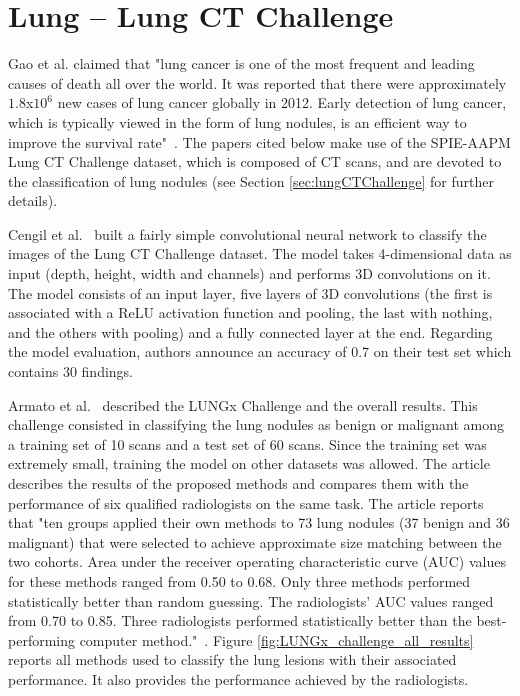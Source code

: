 \section{Lung -- Lung CT Challenge}
\setlength{\marginparwidth}{3cm}\leavevmode {}Gao et al. claimed that "lung cancer is one of the most frequent and leading causes of death all over the world. It was reported that there were approximately $1.8$x$10^6$ new cases of lung cancer globally in 2012. Early detection of lung cancer, which is typically viewed in the form of lung nodules, is an efficient way to improve the survival rate"~\cite{41}. The papers cited below make use of the SPIE-AAPM Lung CT Challenge dataset, which is composed of CT scans, and are devoted to the classification of lung nodules (see Section \ref{sec:lungCTChallenge} for further details).

Cengil et al.~\cite{02} built a fairly simple convolutional neural network to classify the images of the Lung CT Challenge dataset. The model takes 4-dimensional data as input (depth, height, width and channels) and performs 3D convolutions on it. The model consists of an input layer, five layers of 3D convolutions (the first is associated with a ReLU activation function and pooling, the last with nothing, and the others with pooling) and a fully connected layer at the end. Regarding the model evaluation, authors announce an accuracy of 0.7 on their test set which contains 30 findings.

Armato et al.~\cite{12} described the LUNGx Challenge and the overall results. This challenge consisted in classifying the lung nodules as benign or malignant among a training set of 10 scans and a test set of 60 scans. Since the training set was extremely small, training the model on other datasets was allowed. The article describes the results of the proposed methods and compares them with the performance of six qualified radiologists on the same task. The article reports that "ten groups applied their own methods to 73 lung nodules (37 benign and 36 malignant) that were selected to achieve approximate size matching between the two cohorts. Area under the receiver operating characteristic curve (AUC) values for these methods ranged from 0.50 to 0.68. Only three methods performed statistically better than random guessing. The radiologists’ AUC values ranged from 0.70 to 0.85. Three radiologists performed statistically better than the best-performing computer method."~\cite{12}. Figure \ref{fig:LUNGx_challenge_all_results} reports all methods used to classify the lung lesions with their associated performance. It also provides the performance achieved by the radiologists.

